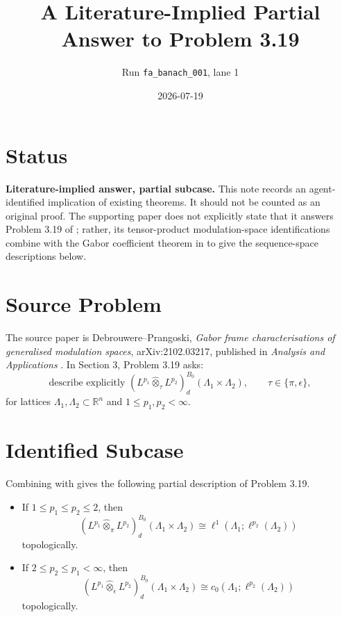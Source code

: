 \documentclass[11pt]{article}
\title{A Literature-Implied Partial Answer to Problem 3.19}
\author{Run \texttt{fa\_banach\_001}, lane 1}
\date{2026-07-19}
\newcommand{\R}{\mathbb{R}}
\newcommand{\otpi}{\widehat{\otimes}_{\pi}}
\newcommand{\oteps}{\widehat{\otimes}_{\epsilon}}
\begin{document}
\maketitle

\section*{Status}

\textbf{Literature-implied answer, partial subcase.}
This note records an agent-identified implication of existing theorems. It
should not be counted as an original proof. The supporting paper does not
explicitly state that it answers Problem 3.19 of \cite{DP2023}; rather, its
tensor-product modulation-space identifications combine with the Gabor
coefficient theorem in \cite{DP2023} to give the sequence-space descriptions
below.

\section*{Source Problem}

The source paper is Debrouwere--Prangoski, \emph{Gabor frame characterisations
of generalised modulation spaces}, arXiv:2102.03217, published in
\emph{Analysis and Applications} \cite{DP2023}. In Section 3, Problem 3.19
asks:
\[
 \text{describe explicitly }
 (L^{p_1}\widehat{\otimes}_{\tau}L^{p_2})^{B_0}_d(\Lambda_1\times\Lambda_2),
 \qquad \tau\in\{\pi,\epsilon\},
\]
for lattices \(\Lambda_1,\Lambda_2\subset\R^n\) and
\(1\leq p_1,p_2<\infty\).

\section*{Identified Subcase}

Combining \cite[Corollary 4.11]{DP2023} with
\cite[Corollary 6.1 and Remark 6.2]{FPP2022} gives the following partial
description of Problem 3.19.

\begin{itemize}
\item If \(1\leq p_1\leq p_2\leq 2\), then
\[
 (L^{p_1}\otpi L^{p_2})^{B_0}_d(\Lambda_1\times\Lambda_2)
 \cong
 \ell^1(\Lambda_1;\ell^{p_2}(\Lambda_2))
\]
topologically.
\item If \(2\leq p_2\leq p_1<\infty\), then
\[
 (L^{p_1}\oteps L^{p_2})^{B_0}_d(\Lambda_1\times\Lambda_2)
 \cong
 c_0(\Lambda_1;\ell^{p_2}(\Lambda_2))
\]
topologically.
\end{itemize}
\end{document}
